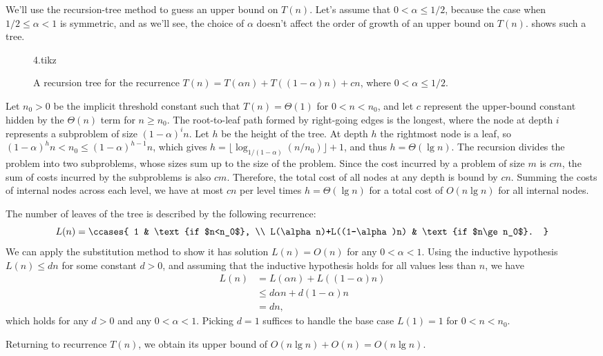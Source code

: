 We'll use the recursion-tree method to guess an upper bound on $T(n)$.
Let's assume that $0<\alpha\le1/2$, because the case when $1/2\le\alpha<1$ is symmetric, and as we'll see, the choice of $\alpha$ doesn't affect the order of growth of an upper bound on $T(n)$.
 shows such a tree.
\begin{figure}[htb]
    {4.tikz}
    \caption{A recursion tree for the recurrence $T(n)=T(\alpha n)+T((1-\alpha)n)+cn$, where $0<\alpha\le1/2$.} \label{fig:4.4-4}
\end{figure}

Let $n_0>0$ be the implicit threshold constant such that $T(n)=\Theta(1)$ for $0<n<n_0$, and let $c$ represent the upper-bound constant hidden by the $\Theta(n)$ term for $n\ge n_0$.
The root-to-leaf path formed by right-going edges is the longest, where the node at depth $i$ represents a subproblem of size $(1-\alpha)^in$.
Let $h$ be the height of the tree.
At depth $h$ the rightmost node is a leaf, so $(1-\alpha)^hn<n_0\le(1-\alpha)^{h-1}n$, which gives $h=\lfloor\log_{1/(1-\alpha)}(n/n_0)\rfloor+1$, and thus $h=\Theta(\lg n)$.
The recursion divides the problem into two subproblems, whose sizes sum up to the size of the problem.
Since the cost incurred by a problem of size $m$ is $cm$, the sum of costs incurred by the subproblems is also $cm$.
Therefore, the total cost of all nodes at any depth is bound by $cn$.
Summing the costs of internal nodes across each level, we have at most $cn$ per level times $h=\Theta(\lg n)$ for a total cost of $O(n\lg n)$ for all internal nodes.

The number of leaves of the tree is described by the following recurrence:
\[
    L(n) =
    \ccases{
        1 & \text{if $n<n_0$}, \\
        L(\alpha n)+L((1-\alpha)n) & \text{if $n\ge n_0$}.
    }
\]
We can apply the substitution method to show it has solution $L(n)=O(n)$ for any $0<\alpha<1$.
Using the inductive hypothesis $L(n)\le dn$ for some constant $d>0$, and assuming that the inductive hypothesis holds for all values less than $n$, we have
\begin{align*}
    L(n) &= L(\alpha n)+L((1-\alpha)n) \\
    &\le d\alpha n+d(1-\alpha)n \\
    &= dn,
\end{align*}
which holds for any $d>0$ and any $0<\alpha<1$.
Picking $d=1$ suffices to handle the base case $L(1)=1$ for $0<n<n_0$.

Returning to recurrence $T(n)$, we obtain its upper bound of $O(n\lg n)+O(n)=O(n\lg n)$.
